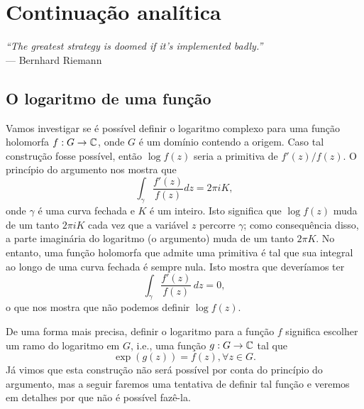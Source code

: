 \chapter[Continuação analítica]{Continuação analítica}
\chaptermark{}

\hfill%
\begin{minipage}{10cm}
    \begin{flushright}
    \rightskip=0.5cm
        \textit{``The greatest strategy is doomed if it's implemented badly.''}
        \\[0.1cm]
    \rightskip=0.5cm
    --- Bernhard Riemann
    \end{flushright}
\end{minipage}

\section{O logaritmo de uma função}

Vamos investigar se é possível definir o logaritmo complexo para uma função holomorfa 
$f: G \to \mathbb{C}$, onde $G$ é um domínio contendo a origem. Caso tal construção fosse possível,
então $\log f(z)$ seria a primitiva de $f'(z)/f(z)$. O princípio do argumento nos mostra que
%
\begin{equation*}
    \int_\gamma \frac{f'(z)}{f(z)} dz = 2\pi i K,
\end{equation*}
%
onde $\gamma$ é uma curva fechada e $K$ é um inteiro. Isto significa que $\log f(z)$ muda 
de um tanto $2\pi i K$ cada vez que a variável $z$ percorre $\gamma$; como consequência disso,
a parte imaginária do logaritmo (o argumento) muda de um tanto $2 \pi K$. No entanto, uma
função holomorfa que admite uma primitiva é tal que sua integral ao longo de uma curva fechada
é sempre nula. Isto mostra que deveríamos ter
%
\begin{equation*}
    \int_\gamma \frac{f'(z)}{f(z)} \, dz = 0,
\end{equation*}
o que nos mostra que não podemos definir $\log f(z)$.

De uma forma mais precisa, definir o logaritmo para a função $f$ significa escolher um ramo 
do logaritmo em $G$, i.e., uma função $g: G \to \mathbb{C}$ tal que 
%
\begin{equation*}
    \exp(g(z)) = f(z), \forall z \in G.  
\end{equation*}
%
Já vimos que esta construção não será possível por conta do princípio do argumento, mas a
seguir faremos uma tentativa de definir tal função e veremos em detalhes por que não é 
possível fazê-la.

